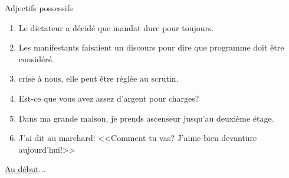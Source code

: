 \begin{frame}{Adjectifs possessifs}
  \begin{enumerate}
    \item Le dictateur a décidé que \underline{} mandat dure pour toujours.
    \item Les manifestants faisaient un discours pour dire que \underline{} programme doit être considéré.
    \item \underline{} crise à nous, elle peut être réglée au scrutin.
    \item Est-ce que vous avez assez d'argent pour \underline{} charges?
    \item Dans ma grande maison, je prends \underline{} ascenseur jusqu'au deuxième étage.
    \item J'ai dit au marchard: <<Comment tu vas? J'aime bien \underline{} devanture aujourd'hui!>>
  \end{enumerate}
  \vspace{0.25cm}
  \raggedleft\raggedleft\hyperlink{début}{Au début}...
\end{frame}